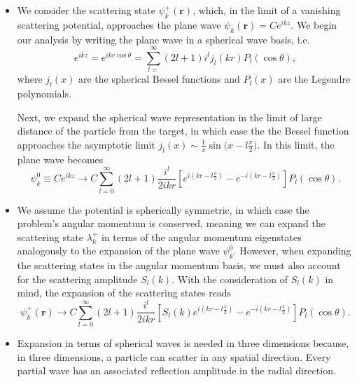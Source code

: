 \documentclass[11pt, a4paper]{article}
\renewcommand{\vec}[1]{\bm{#1}}  %
\renewcommand{\r}{\vec{r}}  %
\begin{document}
\begin{itemize}
    \item We consider the scattering state $ \psi_{k}^{+}(\r) $, which, in the limit of a vanishing scattering potential, approaches the plane wave $ \psi_{k}(\r) = Ce^{i k z} $. We begin our analysis by writing the plane wave in a spherical wave basis, i.e. 
    \begin{equation*}
        e^{ikz} = e^{ikr \cos \theta} = \sum_{l = }^{\infty} (2l + 1)i^{l}j_{l}(kr)P_{l}(\cos \theta),
    \end{equation*}
    where $ j_{l}(x) $ are the spherical Bessel functions and $ P_{l}(x) $ are the Legendre polynomials. 

    Next, we expand the spherical wave representation in the limit of large distance of the particle from the target, in which case the the Bessel function approaches the asymptotic limit $ j_{l}(x) \sim \frac{1}{x} \sin \big( x - l \frac{\pi}{2} \big) $. In this limit, the plane wave becomes
    \begin{equation*}
        \psi_{k}^{0} \equiv Ce^{ikz} \to C \sum_{l = 0}^{\infty} (2l + 1)\frac{i^{l}}{2ikr}\left[ e^{i(kr - l \frac{\pi}{2})} - e^{-i(kr - l \frac{\pi}{2})} \right]P_{l}(\cos \theta).
    \end{equation*}
    
    \item We assume the potential is spherically symmetric, in which case the problem's angular momentum is conserved, meaning we can expand the scattering state $ \lambda_{k}^{+} $ in terms of the angular momentum eigenstates analogously to the expansion of the plane wave $ \psi_{k}^{0} $. However, when expanding the scattering states in the angular momentum basis, we must also account for the scattering amplitude $ S_{l}(k) $. With the consideration of $ S_{l}(k) $ in mind, the expansion of the scattering states reads
    \begin{equation*}
        \psi_{k}^{+}(\r) \to C \sum_{l = 0}^{\infty} (2l + 1)\frac{i^{l}}{2ikr}\left[ S_{l}(k)e^{i(kr - l \frac{\pi}{2})} - e^{-i(kr - l \frac{\pi}{2})} \right]P_{l}(\cos \theta).
    \end{equation*}
    
    \item Expansion in terms of spherical waves is needed in three dimensions because, in three dimensions, a particle can scatter in any spatial direction. Every partial wave has an associated reflection amplitude in the radial direction. 


\end{itemize}
\end{document}
